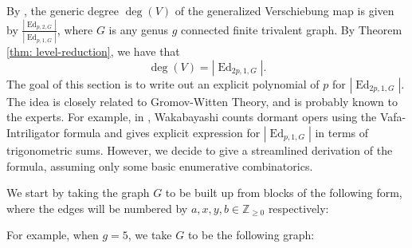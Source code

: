 \documentclass[11pt]{amsart}
\newcommand{\Ed}{\operatorname{Ed}}
\begin{document}
By \cite[Theorem 5.3]{KW}, the generic degree $\deg(V)$ of the generalized Verschiebung map is given by $\frac{|\Ed_{p,2,G}|}{|\Ed_{p,1,G}|}$, where $G$ is any genus $g$ connected finite trivalent graph.
By Theorem \ref{thm: level-reduction}, we have that 
\begin{equation}\label{eq: V 2p G}
    \deg(V)=|\Ed_{2p,1,G}|.
\end{equation}
The goal of this section is to write out an explicit polynomial of $p$ for $|\Ed_{2p,1,G}|$.
The idea is closely related to Gromov-Witten Theory, and is probably known to the experts.
For example, in \cite[Theorem A]{WakFormula}, Wakabayashi counts dormant opers using the Vafa-Intriligator formula and gives explicit expression for $|\Ed_{p,1,G}|$ in terms of trigonometric sums.
However, we decide to give a streamlined derivation of the formula, assuming only some basic enumerative combinatorics. 



We start by taking the graph $G$ to be built up from blocks of the following form, where the edges will be numbered by $a,x,y,b\in \mathbb{Z}_{\geq 0}$ respectively:

\begin{center}
\centering
{}
\end{center}
For example, when $g=5$, we take $G$ to be the following graph:
\begin{center}
\centering
{}
\end{center}
\end{document}
